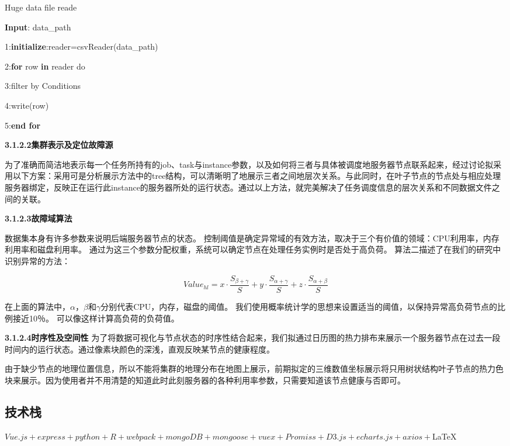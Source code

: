 \begin{algorithm}
	\caption{Huge data file reade}
	\label{alg-1} 
	\textbf{Input}: data\_path
	
	1:\textbf{initialize}:reader=csvReader(data\_path)
	
	2:\textbf{for} row  \textbf{in} reader do
	
	3:\qquad filter by Conditions
	
	4:\qquad write(row)
	
	5:\textbf{end for}

\end{algorithm}

{\textbf{3.1.2.2\quad 集群表示及定位故障源}}

为了准确而简洁地表示每一个任务所持有的job、task与instance参数，以及如何将三者与具体被调度地服务器节点联系起来，经过讨论拟采用以下方案：采用可是分析展示方法中的tree结构，可以清晰明了地展示三者之间地层次关系。与此同时，在叶子节点的节点处与相应处理服务器绑定，反映正在运行此instance的服务器所处的运行状态。通过以上方法，就完美解决了任务调度信息的层次关系和不同数据文件之间的关联。

{\textbf{3.1.2.3\quad 故障域算法}}

数据集本身有许多参数来说明后端服务器节点的状态。 控制阈值是确定异常域的有效方法，取决于三个有价值的领域：CPU利用率，内存利用率和磁盘利用率。 通过为这三个参数分配权重，系统可以确定节点在处理任务实例时是否处于高负荷。 算法二描述了在我们的研究中识别异常的方法：

$$Value_{hl}=x\cdot\frac{S_{\beta +\gamma}}{S}+y\cdot\frac{S_{\alpha+\gamma}}{S}+z\cdot\frac{S_{\alpha+\beta}}{S}$$

在上面的算法中，$\alpha$，$\beta$和$\gamma$分别代表CPU，内存，磁盘的阈值。 我们使用概率统计学的思想来设置适当的阈值，以保持异常高负荷节点的比例接近10％。 可以像这样计算高负荷的负荷值。

{\textbf{3.1.2.4\quad 时序性及空间性}}
为了将数据可视化与节点状态的时序性结合起来，我们拟通过日历图的热力排布来展示一个服务器节点在过去一段时间内的运行状态。通过像素块颜色的深浅，直观反映某节点的健康程度。

由于缺少节点的地理位置信息，所以不能将集群的地理分布在地图上展示，前期拟定的三维数值坐标展示将只用树状结构叶子节点的热力色块来展示。因为使用者并不用清楚的知道此时此刻服务器的各种利用率参数，只需要知道该节点健康与否即可。

\subsection{技术栈}
$Vue.js+express+python+R+webpack+mongoDB+mongoose+vuex+Promiss+D3.js+
echarts.js+axios+$\LaTeX$ $

